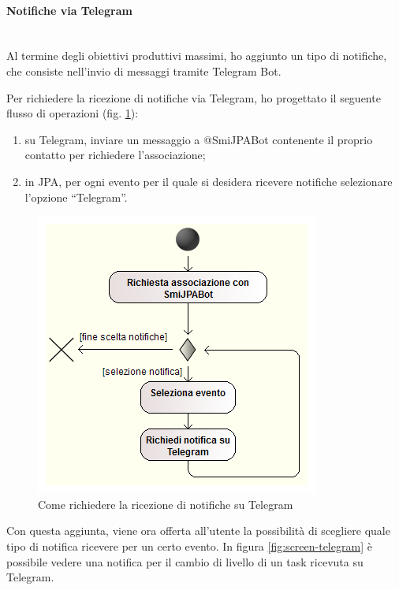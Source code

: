 \paragraph{Notifiche via Telegram} \mbox{} \\

Al termine degli obiettivi produttivi massimi, ho aggiunto un tipo di
notifiche, che consiste nell'invio di messaggi tramite Telegram Bot.

Per richiedere la ricezione di notifiche via Telegram, ho progettato il
seguente flusso di operazioni (fig. \ref{fig:telegram-request}):

\begin{enumerate}
\item su Telegram, inviare un messaggio a @SmiJPABot contenente il proprio
  contatto per richiedere l'associazione;
\item in JPA, per ogni evento per il quale si desidera ricevere notifiche
  selezionare l'opzione ``Telegram''.
\end{enumerate}

\begin{figure}[H]%
\centering
\includegraphics[width=.8\columnwidth]{immagini/telegram-notif-wf}
\caption{Come richiedere la ricezione di notifiche su Telegram}
\label{fig:telegram-request}%
\end{figure}

Con questa aggiunta, viene ora offerta all'utente la possibilità di scegliere
quale tipo di notifica ricevere per un certo evento. In figura
\ref{fig:screen-telegram} è possibile vedere una notifica per il cambio di
livello di un task ricevuta su Telegram.

